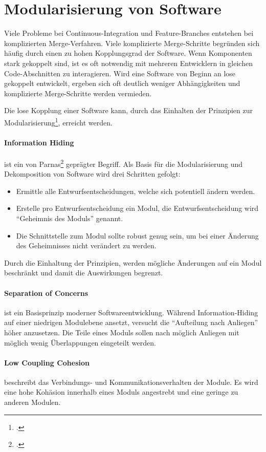 \section{Modularisierung von Software}

Viele Probleme bei Continuous-Integration und Feature-Branches entstehen bei komplizierten Merge-Verfahren. Viele komplizierte Merge-Schritte begründen sich häufig durch einen zu hohen Kopplungsgrad der Software. Wenn Komponenten stark gekoppelt sind, ist es oft notwendig mit mehreren Entwicklern in gleichen Code-Abschnitten zu interagieren. Wird eine Software von Beginn an lose gekoppelt entwickelt, ergeben sich oft deutlich weniger Abhängigkeiten und komplizierte Merge-Schritte werden vermieden.

Die lose Kopplung einer Software kann, durch das Einhalten der Prinzipien zur Modularisierung\footcite{2012-barth-modularisation}, erreicht werden. 

\paragraph{Information Hiding} ist ein von Parnas\footcite{1972-parnas} geprägter Begriff. Als Basis für die Modularisierung und Dekomposition von Software wird drei Schritten gefolgt:
\begin{itemize}
\item Ermittle alle Entwurfsentscheidungen, welche sich potentiell ändern werden.
\item Erstelle pro Entwurfsentscheidung ein Modul, die Entwurfsentscheidung wird ``Geheimnis des Moduls'' genannt.
\item Die Schnittstelle zum Modul sollte robust genug sein, um bei einer Änderung des Geheimnisses nicht verändert zu werden.
\end{itemize}
Durch die Einhaltung der Prinzipien, werden mögliche Änderungen auf ein Modul beschränkt und damit die Auswirkungen begrenzt.
\paragraph{Separation of Concerns} ist ein Basisprinzip moderner Softwareentwicklung. Während Information-Hiding auf einer niedrigen Modulebene ansetzt, versucht die ``Aufteilung nach Anliegen'' höher anzusetzen. Die Teile eines Moduls sollen nach möglich Anliegen  mit möglich wenig Überlappungen eingeteilt werden. 
\paragraph{Low Coupling Cohesion} beschreibt das Verbindungs- und Kommunikationsverhalten der Module. Es wird eine hohe Kohäsion innerhalb eines Moduls angestrebt und eine geringe zu anderen Modulen.


